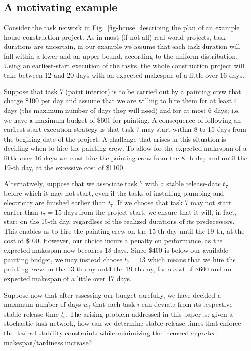 
\subsection{A motivating example}

Consider the task network in Fig.~\ref{fig-house} describing the plan of an example house construction project.
As in most (if not all) real-world projects, task durations are uncertain,
in our example we assume that each task duration will fall within a lower and an upper bound, according to the uniform distribution.
Using an earliest-start execution of the tasks,
the whole construction project will take between 12 and 20 days with an expected makespan of a little over 16 days.

Suppose that task 7 (paint interior) is to be carried out by a painting crew that charge \$100 per day
and assume that we are willing to hire them for at least 4 days (the maximum number of days they will need) and for at most 6 days;
i.e. we have a maximum budget of \$600 for painting.
A consequence of following an earliest-start execution strategy is that
task 7  may start within 8 to 15 days from the begining date of the project.
A challenge that arises in this situation is deciding when to hire the painting crew.
To allow for the expected makespan of a little over 16 days we must hire the painting crew from the 8-th day and until the 19-th day, 
at the excessive cost of \$1100.

Alternatively, suppose that we associate task 7 with a stable release-date $t_7$ before which it may not start,
even if the tasks of installing plumbing and electricity are finished earlier than $t_7$.
If we choose that task 7 may not start earlier than $t_7 = 15$ days from the project start,
we ensure that it will, in fact, start on the 15-th day, regardless of the realized durations of its predecessors.
This enables us to hire the painting crew on the 15-th day until the 19-th, at the cost of \$400.
However, our choice incurs a penalty on performance, as the expected makespan now becomes 18 days.
Since \$400 is below our available painting budget,
we may instead choose $t_7 = 13$ which means that we hire the painting crew on the 13-th day until the 19-th day, 
for a cost of \$600 and an expected makespan of a little over 17 days.

Suppose now that after assessing our budget carefully,
we have decided a maximum number of days $w_i$ that each task $i$ can deviate from its respective stable release-time $t_i$.
The arising problem addressed in this paper is:
given a stochastic task network, how can we determine stable release-times that 
enforce the desired stability constraints while minimizing the incurred expected makespan/tardiness increase?

